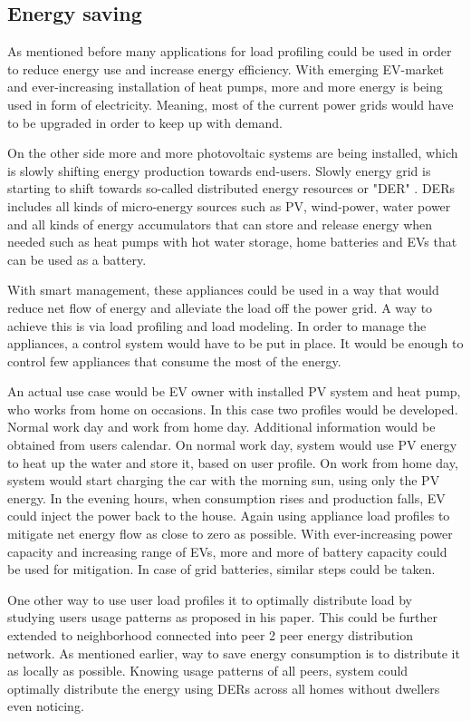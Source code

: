 \documentclass[
11pt, %
english, %
singlespacing, %
headsepline, %
]{MastersDoctoralThesis} %
\begin{document}
\subsection{Energy saving}

As mentioned before many applications for load profiling could be used in order to reduce energy use and increase energy efficiency. 
With emerging EV-market and ever-increasing installation of heat pumps, more and more energy is being used in form of electricity. 
Meaning, most of the current power grids would have to be upgraded in order to keep up with demand.

On the other side more and more photovoltaic systems are being installed, which is slowly shifting energy production towards end-users.
Slowly energy grid is starting to shift towards so-called distributed energy resources or "DER" \cite{MORENOJARAMILLO2021445}.
DERs includes all kinds of micro-energy sources such as PV, wind-power, water power and all kinds of energy accumulators that can store 
and release energy when needed such as heat pumps with hot water storage, home batteries and EVs that can be used as a battery.

With smart management, these appliances could be used in a way that would reduce net flow of energy and alleviate the load off the power grid.
A way to achieve this is via load profiling and load modeling. 
In order to manage the appliances, a control system would have to be put in place. 
It would be enough to control few appliances that consume the most of the energy. 

An actual use case would be EV owner with installed PV system and heat pump, who works from home on occasions. 
In this case two profiles would be developed. Normal work day and work from home day.
Additional information would be obtained from users calendar. 
On normal work day, system would use PV energy to heat up the water and store it, based on user profile.
On work from home day, system would start charging the car with the morning sun, using only the PV energy. 
In the evening hours, when consumption rises and production falls, EV could inject the power back to the house.
Again using appliance load profiles to mitigate net energy flow as close to zero as possible. 
With ever-increasing power capacity and increasing range of EVs, more and more of battery capacity could be used for mitigation. 
In case of grid batteries, similar steps could be taken.

One other way to use user load profiles it to optimally distribute load by studying users usage patterns as \cite{Chuan2014} proposed in his paper. 
This could be further extended to neighborhood connected into peer 2 peer energy distribution network.
As mentioned earlier, way to save energy consumption is to distribute it as locally as possible. 
Knowing usage patterns of all peers, system could optimally distribute the energy using DERs across all homes without dwellers even noticing.
\end{document}
